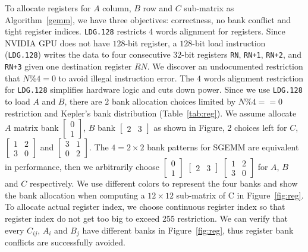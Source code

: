 To allocate registers for $A$ column, $B$ row and $C$ sub-matrix as Algorithm~\ref{gemm}, we have three objectives: correctness, no bank conflict and tight register indices.
{\tt LDG.128} restricts $4$ words alignment for registers.
Since NVIDIA GPU does not have $128$-bit register, a $128$-bit load instruction ({\tt LDG.128}) writes the data to four consecutive $32$-bit registers {\tt RN}, {\tt RN+1}, {\tt RN+2}, and {\tt RN+3} given one destination register $RN$.
We discover an undocumented restriction that $N\%4=0$ to avoid illegal instruction error.
The $4$ words alignment restriction for {\tt LDG.128} simplifies hardware logic and cuts down power.
Since we use {\tt LDG.128} to load $A$ and $B$, there are $2$ bank allocation choices limited by $N\%4==0$ restriction and Kepler's bank distribution (Table~\ref{tab:reg}). 
We assume allocate $A$ matrix bank $\begin{bmatrix} 0 \\ 1  \end{bmatrix}$,
$B$ bank $\begin{bmatrix} 2 & 3 \end{bmatrix}$ as shown in Figure, 2 choices left for $C$, 
$\begin{bmatrix} 1 & 2 \\ 3 & 0  \end{bmatrix}$ and 
$\begin{bmatrix} 3 & 1 \\ 0 & 2  \end{bmatrix}$.
The $4=2\times2$ bank patterns for SGEMM are equivalent in performance, then we arbitrarily 
choose $\begin{bmatrix} 0 \\ 1  \end{bmatrix}$ $\begin{bmatrix} 2 & 3 \end{bmatrix}$
    $\begin{bmatrix} 1 & 2 \\ 3 & 0  \end{bmatrix}$ for $A$, $B$ and $C$ respectively.
We use different colors to represent the four banks and show the bank allocation when computing a $12 \times 12$ sub-matrix of C in Figure~\ref{fig:reg}.
To allocate actual register index, we choose continuous register index so that register index do not get too big to exceed 255 restriction. 
We can verify that every $C_{ij}$, $A_i$ and $B_j$ have different banks in Figure~\ref{fig:reg}, thus register bank conflicts are successfully avoided.

